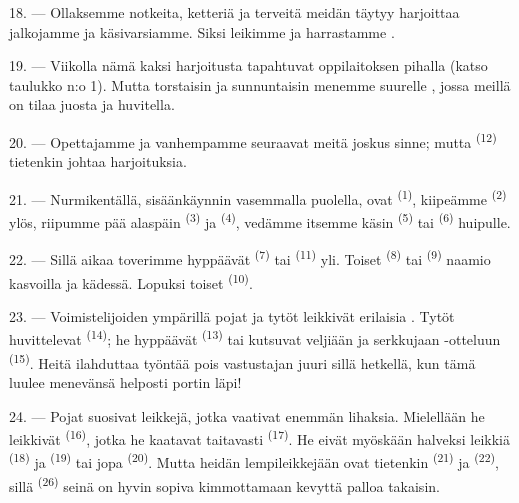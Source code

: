 18. --- Ollaksemme notkeita, ketteriä ja terveitä meidän täytyy harjoittaa
jalkojamme ja käsivarsiamme. Siksi leikimme ja harrastamme .

19. --- Viikolla nämä kaksi harjoitusta tapahtuvat oppilaitoksen pihalla (katso
taulukko n:o 1). Mutta torstaisin ja sunnuntaisin menemme suurelle
, jossa meillä on tilaa juosta ja huvitella.

20. --- Opettajamme ja vanhempamme seuraavat meitä joskus sinne; mutta
 \textsuperscript{(12)} tietenkin johtaa
harjoituksia.

21. --- Nurmikentällä, sisäänkäynnin vasemmalla puolella, ovat
 \textsuperscript{(1)}, kiipeämme 
\textsuperscript{(2)} ylös, riipumme pää alaspäin 
\textsuperscript{(3)} ja  \textsuperscript{(4)}, vedämme
itsemme käsin  \textsuperscript{(5)} tai
 \textsuperscript{(6)} huipulle.

22. --- Sillä aikaa toverimme hyppäävät 
\textsuperscript{(7)} tai  \textsuperscript{(11)} yli. Toiset
 \textsuperscript{(8)} tai 
\textsuperscript{(9)} naamio kasvoilla ja  kädessä. Lopuksi
toiset   \textsuperscript{(10)}.

\VUsaut{4.6mm}
\VUsaut{3.0mm}

23. --- Voimistelijoiden ympärillä pojat ja tytöt leikkivät erilaisia
. Tytöt huvittelevat 
\textsuperscript{(14)}; he hyppäävät  \textsuperscript{(13)} tai
kutsuvat veljiään ja serkkujaan -otteluun
\textsuperscript{(15)}. Heitä ilahduttaa työntää pois vastustajan
  juuri sillä hetkellä, kun tämä luulee
menevänsä helposti portin läpi!

24. --- Pojat suosivat leikkejä, jotka vaativat enemmän lihaksia. Mielellään he
leikkivät  \textsuperscript{(16)}, jotka he kaatavat taitavasti
 \textsuperscript{(17)}. He eivät myöskään halveksi leikkiä
 \textsuperscript{(18)} ja 
\textsuperscript{(19)} tai jopa  \textsuperscript{(20)}.
Mutta heidän lempileikkejään ovat tietenkin 
\textsuperscript{(21)} ja  \textsuperscript{(22)}, sillä
 \textsuperscript{(26)} seinä on hyvin sopiva
kimmottamaan kevyttä palloa takaisin.

